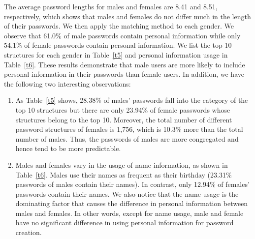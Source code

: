 The average password lengths for males and females are 8.41 and 8.51,
respectively, which shows that males and females do not differ much in
the length of their passwords. We then apply the matching method to
each gender. We observe that 61.0\% of male passwords contain personal
information while only 54.1\% of female passwords contain personal
information. We list the top 10 structures for each gender in
Table~\ref{t5} and personal information usage in Table~\ref{t6}. These
results demonstrate that male users are more likely to include
personal information in their passwords than female users. In
addition, we have the following two interesting observations:

\begin{enumerate}[leftmargin=*]

\item As Table~\ref{t5} shows, 28.38\% of males' passwords fall into
  the category of the top 10 structures but there are only 23.94\% of
  female passwords whose structures belong to the top 10. Moreover,
  the total number of different password structures of females is
  1,756, which is 10.3\% more than the total number of males. Thus,
  the passwords of males are more congregated and hence tend to be
  more predictable.

\item Males and females vary in the usage of name information, as
  shown in Table~\ref{t6}. Males use their names as frequent as their
  birthday (23.31\% passwords of males contain their names). In
  contrast, only 12.94\% of females' passwords contain their names. We
  also notice that the name usage is the dominating factor that causes
  the difference in personal information between males and females. In
  other words, except for name usage, male and female have no significant
  difference in using personal information for password creation.
\end{enumerate} 


